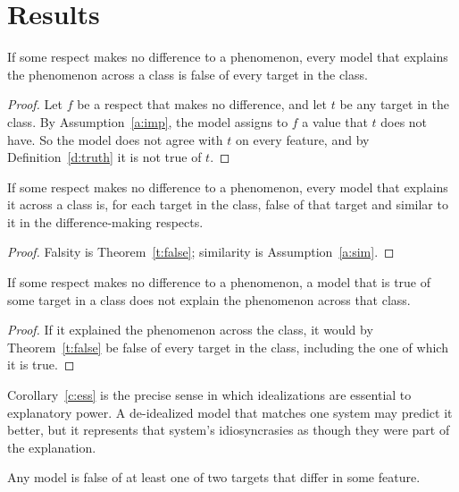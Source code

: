 \documentclass{situationist-preprint}
\begin{document}
\section{Results}

\begin{theorem}\label{t:false}
If some respect makes no difference to a phenomenon, every model that explains the phenomenon across a class is false of every target in the class.
\end{theorem}

\begin{proof}
Let $f$ be a respect that makes no difference, and let $t$ be any target in the class. By Assumption~\ref{a:imp}, the model assigns to $f$ a value that $t$ does not have. So the model does not agree with $t$ on every feature, and by Definition~\ref{d:truth} it is not true of $t$.
\end{proof}

\begin{theorem}\label{t:sim}
If some respect makes no difference to a phenomenon, every model that explains it across a class is, for each target in the class, false of that target and similar to it in the difference-making respects.
\end{theorem}

\begin{proof}
Falsity is Theorem~\ref{t:false}; similarity is Assumption~\ref{a:sim}.
\end{proof}

\begin{corollary}\label{c:ess}
If some respect makes no difference to a phenomenon, a model that is true of some target in a class does not explain the phenomenon across that class.
\end{corollary}

\begin{proof}
If it explained the phenomenon across the class, it would by Theorem~\ref{t:false} be false of every target in the class, including the one of which it is true.
\end{proof}

Corollary~\ref{c:ess} is the precise sense in which idealizations are essential to explanatory power. A de-idealized model that matches one system may predict it better, but it represents that system's idiosyncrasies as though they were part of the explanation.

\begin{proposition}[Heterogeneity]\label{p:het}
Any model is false of at least one of two targets that differ in some feature.
\end{proposition}
\end{document}
